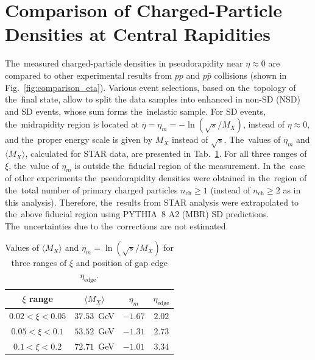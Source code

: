 \section{Comparison of Charged-Particle Densities at Central Rapidities}\label{chapter:discussion}
\label{sec:comparison_eta}
The~measured charged-particle densities in pseudorapidity near  $\eta\approx 0$ are compared to other experimental results from $pp$ and $p\bar{p}$ collisions (shown in Fig.~\ref{fig:comparison_eta}). Various event selections, based on the~topology of the~final state, allow to split the data samples into enhanced in non-\ac{SD} (NSD)  and  \ac{SD} events, whose  sum forms the~inelastic sample. For \ac{SD} events, 
the~midrapidity region  is  located at $\bar{\eta}=\eta_{m}=-\ln(\sqrt{s}/M_{X})$, instead of $\eta\approx 0$, and the~proper energy scale is given by $M_X$ instead of $\sqrt{s}$.
The~values of $\eta_{m}$ and $\langle M_{X}\rangle$, calculated  for STAR data, are presented in Tab.~\ref{tab:etabarComparison}. 
For all three  ranges of $\xi$, the~value of $\eta_{m}$ is outside the~fiducial region of the measurement. In the~case of other experiments  the~pseudorapidity densities were obtained  in the~region of the~total number of primary charged particles $n_\textrm{ch}\geq1$  (instead of $n_\textrm{ch}\geq2$ as in this analysis).   Therefore, the~results from STAR  analysis were extrapolated  to the~above fiducial region using PYTHIA~8 A2 (MBR) \ac{SD}   predictions. The~uncertainties due to the~corrections are not estimated.

\begin{table}[h!]
	\centering
	\begin{tabular}{ |c|c|c|c| }
		\hline
		$\xi$ range &  $\langle M_X \rangle$ & $\eta_m$ & $\eta_\textrm{edge}$ \\
		\hline
		$0.02<\xi<0.05$ & $37.53$~GeV & $-1.67$ & $2.02$\\
		$0.05<\xi<0.1$ & $53.52$~GeV &  $-1.31$ & $2.73$\\
		$0.1<\xi<0.2$ & $72.71$~GeV & $-1.01$ & $3.34$\\
		\hline
	\end{tabular}
	\caption{Values of $\langle M_X \rangle$ and $\eta_m=\ln(\sqrt{s}/M_X)$ for three ranges of $\xi$ and position of gap edge $\eta_\textrm{edge}$.}
	\label{tab:etabarComparison}
	\vspace{0.8cm}
\end{table}

